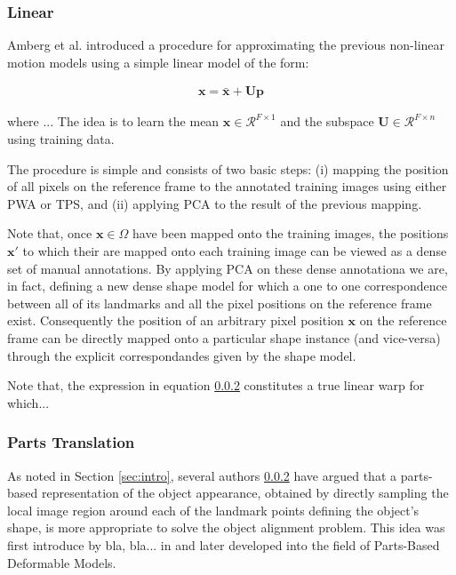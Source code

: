 \subsubsection{Linear}

Amberg et al. \cite{Amberg2009} introduced a procedure for approximating the previous non-linear motion models using a simple linear model of the form:

\begin{equation}
	\begin{aligned}
		\mathbf{x} = \bar{\mathbf{x}} + \mathbf{U} \mathbf{p}
	\end{aligned}
    \label{eq:subspace_warp}
\end{equation}

where ... The idea is to learn the mean $\mathbf{x} \in \mathcal{R}^{F \times 1}$ and the subspace $\mathbf{U}\in \mathcal{R}^{F \times n}$ using training data. 

The procedure is simple and consists of two basic steps: (i) mapping the position of all pixels on the reference frame to the annotated training images using either PWA or TPS, and (ii) applying PCA to the result of the previous mapping. 

Note that, once $\mathbf{x} \in \Omega$ have been mapped onto the training images, the positions $\mathbf{x}'$ to which their are mapped onto each training image can be viewed as a dense set of manual annotations. By applying PCA on these dense annotationa we are, in fact, defining a new dense shape model for which a one to one correspondence between all of its landmarks and all the pixel positions on the reference frame exist. Consequently the position of an arbitrary pixel position $\mathbf{x}$ on the reference frame can be directly mapped onto a particular shape instance (and  vice-versa) through the explicit correspondandes given by the shape model.

Note that, the expression in equation \ref{} constitutes a true linear warp for which...

\subsubsection{Parts Translation}

As noted in Section \ref{sec:intro}, several authors \ref{} have argued that a parts-based representation of the object appearance, obtained by directly sampling the local image region around each of the landmark points defining the object's shape, is more appropriate to solve the object alignment problem. This idea was first introduce by bla, bla... in \cite{} and later developed into the field of Parts-Based Deformable Models.

